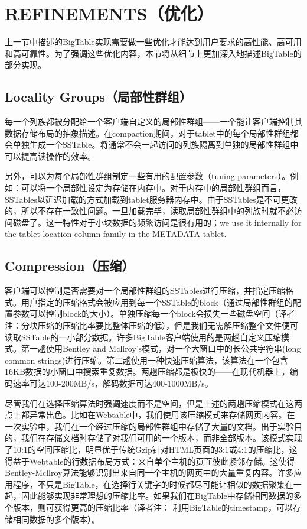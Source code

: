 \documentclass{article}
\begin{document}
\section{REFINEMENTS（优化）}
上一节中描述的BigTable实现需要做一些优化才能达到用户要求的高性能、高可用和高可靠性。为了强调这些优化内容，本节将从细节上更加深入地描述BigTable的部分实现。

\subsection{Locality Groups（局部性群组）}
每一个列族都被分配给一个客户端自定义的局部性群组——一个能让客户端控制其数据存储布局的抽象描述。在compaction期间，对于tablet中的每个局部性群组都会单独生成一个SSTable。将通常不会一起访问的列族隔离到单独的局部性群组中可以提高读操作的效率。\par
另外，可以为每个局部性群组制定一些有用的配置参数（tuning parameters）。例如：可以将一个局部性设定为存储在内存中。对于内存中的局部性群组而言，SSTables以延迟加载的方式加载到tablet服务器内存中。由于SSTables是不可更改的，所以不存在一致性问题。一旦加载完毕，读取局部性群组中的列族时就不必访问磁盘了。这一特性对于小块数据的频繁访问是很有用的；we use it internally for the tablet-location column family in the METADATA tablet.

\subsection{Compression（压缩）}
客户端可以控制是否需要对一个局部性群组的SSTables进行压缩，并指定压缩格式。用户指定的压缩格式会被应用到每一个SSTable的block（通过局部性群组的配置参数可以控制block的大小）。单独压缩每一个block会损失一些磁盘空间（译者注：分块压缩的压缩比率要比整体压缩的低），但是我们无需解压缩整个文件便可读取SSTable的一小部分数据。许多BigTable客户端使用的是两趟自定义压缩模式。第一趟使用Bentley and Mcllroy's模式，对一个大窗口中的长公共字符串(long common strings)进行压缩。第二趟使用一种快速压缩算法，该算法在一个包含16KB数据的小窗口中搜索重复数据。两趟压缩都是极快的——在现代机器上，编码速率可达100-200MB/s，解码数据可达400-1000MB/s。\par
尽管我们在选择压缩算法时强调速度而不是空间，但是上述的两趟压缩模式在这两点上都异常出色。比如在Webtable中，我们使用该压缩模式来存储网页内容。在一次实验中，我们在一个经过压缩的局部性群组中存储了大量的文档。出于实验目的，我们在存储文档时存储了对我们可用的一个版本，而非全部版本。该模式实现了10:1的空间压缩比，明显优于传统Gzip针对HTML页面的3:1或4:1的压缩比，这得益于Webtable的行数据布局方式：来自单个主机的页面彼此紧邻存储。这使得Bentley-Mcllroy算法能够识别出来自同一个主机的网页中的大量重复内容。许多应用程序，不只是BigTable，在选择行关键字的时候都尽可能让相似的数据聚集在一起，因此能够实现非常理想的压缩比率。如果我们在BigTable中存储相同数据的多个版本，则可获得更高的压缩比率（译者注： 利用BigTable的timestamp，可以存储相同数据的多个版本）。
\end{document}
